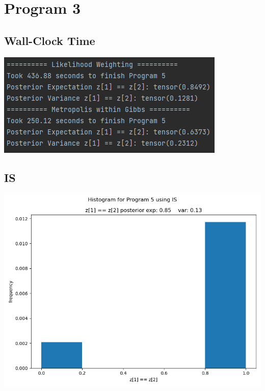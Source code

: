 \documentclass[10pt]{homeworg}
\begin{document}

\section{Program 3}
\subsection{Wall-Clock Time}
\begin{center}
\includegraphics{figures/program_3_time.png}
\end{center}

\subsection{IS}
\begin{center}
\includegraphics[scale=0.5]{figures/IS_program_5.png}
\end{center}
\end{document}
